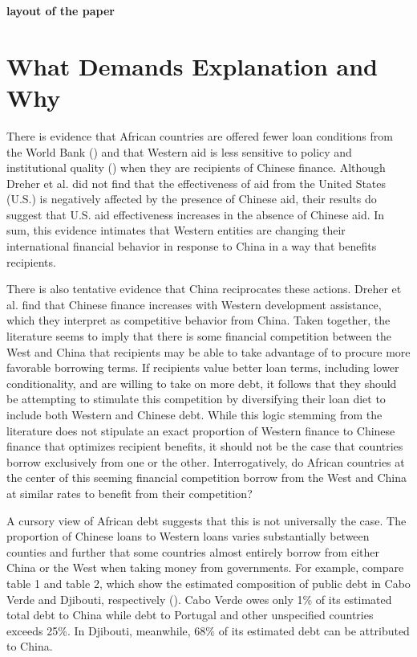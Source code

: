 \documentclass[12pt]{article}
\begin{document}
\textbf{layout of the paper}

\section*{What Demands Explanation and Why}
There is evidence that African countries are offered fewer loan conditions from the World Bank (\cite{hernandez2017}) and that Western aid is less sensitive to policy and institutional quality (\cite{annen2021}) when they are recipients of Chinese finance. Although Dreher et al. \citeyear{dreher2021} did not find that the effectiveness of aid from the United States (U.S.) is negatively affected by the presence of Chinese aid, their results do suggest that U.S. aid effectiveness increases in the absence of Chinese aid. In sum, this evidence intimates that Western entities are changing their international financial behavior in response to China in a way that benefits recipients.

There is also tentative evidence that China reciprocates these actions. Dreher et al. \citeyear{dreher2018} find that Chinese finance increases with Western development assistance, which they interpret as competitive behavior from China. Taken together, the literature seems to imply that there is some financial competition between the West and China that recipients may be able to take advantage of to procure more favorable borrowing terms. If recipients value better loan terms, including lower conditionality, and are willing to take on more debt, it follows that they should be attempting to stimulate this competition by diversifying their loan diet to include both Western and Chinese debt. While this logic stemming from the literature does not stipulate an exact proportion of Western finance to Chinese finance that optimizes recipient benefits, it should not be the case that countries borrow exclusively from one or the other. Interrogatively, do African countries at the center of this seeming financial competition borrow from the West and China at similar rates to benefit from their competition? 

A cursory view of African debt suggests that this is not universally the case. The proportion of Chinese loans to Western loans varies substantially between counties and further that some countries almost entirely borrow from either China or the West when taking money from governments. For example, compare table 1 and table 2, which show the estimated composition of public debt in Cabo Verde and Djibouti, respectively (\cite{jubileedebtcampaign2018}). Cabo Verde owes only 1\% of its estimated total debt to China while debt to Portugal and other unspecified countries exceeds 25\%. In Djibouti, meanwhile, 68\% of its estimated debt can be attributed to China.
\end{document}
